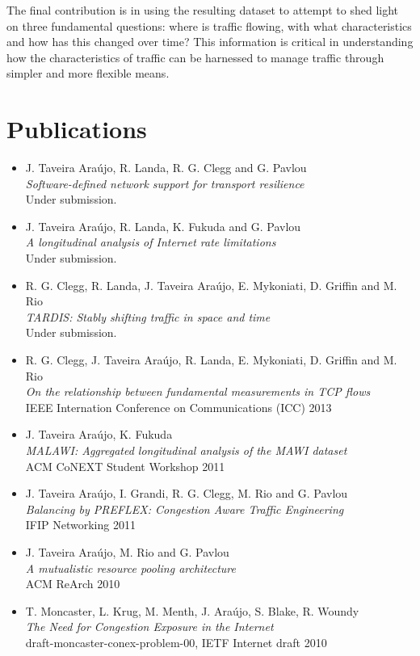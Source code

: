 The final contribution is in using the resulting dataset to attempt to shed light on three fundamental questions: where is traffic flowing, with what characteristics and how has this changed over time? This information is critical in understanding how the characteristics of traffic can be harnessed to manage traffic through simpler and more flexible means.



\section{Publications}
\label{sec:introduction:contributions}

\begin{itemize}
    \item J. Taveira Ara\'{u}jo, R. Landa, R. G. Clegg and G. Pavlou \\
            \emph{Software-defined network support for transport resilience} \\
            Under submission.
    \item J. Taveira Ara\'{u}jo, R. Landa, K. Fukuda and G. Pavlou \\
            \emph{A longitudinal analysis of Internet rate limitations} \\
            Under submission.
    \item R. G. Clegg, R. Landa, J. Taveira Ara\'{u}jo, E. Mykoniati, D. Griffin and M. Rio \\
            \emph{TARDIS: Stably shifting traffic in space and time} \\
            Under submission.
    \item R. G. Clegg, J. Taveira Ara\'{u}jo, R. Landa, E. Mykoniati, D. Griffin and M. Rio \\
            \emph{On the relationship between fundamental measurements in \ac{TCP} flows} \\
            {IEEE Internation Conference on Communications (ICC) 2013}
    \item J. Taveira Ara\'{u}jo, K. Fukuda \\
            \emph{MALAWI: Aggregated longitudinal analysis of the MAWI dataset} \\
            {ACM CoNEXT Student Workshop 2011}
    \item J. Taveira Ara\'{u}jo, I. Grandi, R. G. Clegg, M. Rio and G. Pavlou \\
            \emph{Balancing by PREFLEX: Congestion Aware Traffic Engineering} \\
            {IFIP Networking 2011}
    \item J. Taveira Ara\'{u}jo, M. Rio and G. Pavlou \\
        \emph{A mutualistic resource pooling architecture} \\
        {ACM ReArch 2010}
    \item T. Moncaster, L. Krug, M. Menth, J. Ara\'{u}jo, S. Blake, R. Woundy \\
        \emph{The Need for Congestion Exposure in the Internet} \\
        {draft-moncaster-conex-problem-00, IETF Internet draft 2010}
\end{itemize}

